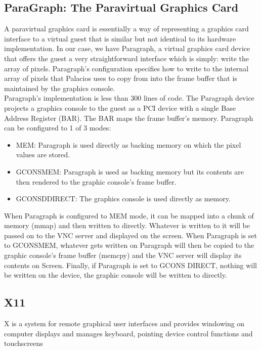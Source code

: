 \documentclass{acm_proc_article-sp}
\begin{document}
\subsection{ParaGraph: The Paravirtual Graphics Card}
A paravirtual graphics card is essentially a way of representing a graphics card
interface to a virtual guest that is similar but not identical to its hardware
implementation. In our case, we have Paragraph, a virtual graphics card device
that offers the guest a very straightforward interface which is simply: write
the array of pixels. Paragraph's configuration specifies how to write to the
internal array of pixels that Palacios uses to copy from into the frame buffer
that is maintained by the graphics console. \\
Paragraph's implementation is less than 300 lines of code.
The Paragraph device projects a graphics console to the guest as a PCI device
with a single Base Address Register (BAR). The BAR maps the frame buffer's memory.
Paragraph can be configured to 1 of 3 modes: \\
\begin{itemize}
\item MEM: Paragraph is used directly as backing memory on which the pixel values
are stored.
\item GCONS\textunderscore MEM: Paragraph is used as backing memory but its contents are
then rendered to the graphic console's frame buffer.
\item GCONSD\textunderscore DIRECT: The graphics console is used directly as memory.
\end{itemize}
When Paragraph is configured to MEM mode, it can be mapped into a chunk of
memory (mmap) and then written to directly. Whatever is written to it will be
passed on to the VNC server and displayed on the screen. When Paragraph is set
to GCONS\textunderscore MEM, whatever gets written on Paragraph will then be
copied to the graphic console's frame buffer (memcpy) and the VNC server will
display its contents on Screen. Finally, if Paragraph is set to GCONS
\textunderscore DIRECT, nothing will be written on the device, the graphic
console will be written to directly.

\subsection{X11}
X is a system for remote graphical user interfaces and provides windowing on computer displays and manages keyboard, pointing device control functions and touchscreens%
\end{document}
